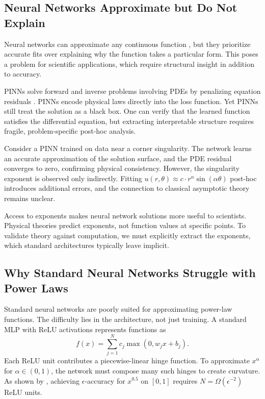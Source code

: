 \documentclass{article}
\theoremstyle{plain}
\theoremstyle{definition}
\theoremstyle{remark}
\begin{document}
\subsection{Neural Networks Approximate but Do Not Explain}

Neural networks can approximate any continuous function \cite{cybenko1989approximation}, but they prioritize accurate fits over explaining why the function takes a particular form. This poses a problem for scientific applications, which require structural insight in addition to accuracy.

PINNs solve forward and inverse problems involving PDEs by penalizing equation residuals \cite{raissi2019physics,karniadakis2021physics}. PINNs encode physical laws directly into the loss function. Yet PINNs still treat the solution as a black box. One can verify that the learned function satisfies the differential equation, but extracting interpretable structure requires fragile, problem-specific post-hoc analysis.

Consider a PINN trained on data near a corner singularity. The network learns an accurate approximation of the solution surface, and the PDE residual converges to zero, confirming physical consistency. However, the singularity exponent is observed only indirectly. Fitting $u(r,\theta) \approx c \cdot r^\alpha \sin(\alpha\theta)$ post-hoc introduces additional errors, and the connection to classical asymptotic theory remains unclear.

Access to exponents makes neural network solutions more useful to scientists. Physical theories predict exponents, not function values at specific points. To validate theory against computation, we must explicitly extract the exponents, which standard architectures typically leave implicit.

\subsection{Why Standard Neural Networks Struggle with Power Laws}

Standard neural networks are poorly suited for approximating power-law functions. The difficulty lies in the architecture, not just training. A standard MLP with ReLU activations represents functions as
\begin{equation}
	f(x) = \sum_{j=1}^{N} c_j \max(0, w_j x + b_j).
\end{equation}
Each ReLU unit contributes a piecewise-linear hinge function. To approximate $x^\alpha$ for $\alpha \in (0,1)$, the network must compose many such hinges to create curvature. As shown by \citet{nguessan2025msn}, achieving $\epsilon$-accuracy for $x^{0.5}$ on $[0,1]$ requires $N = \Omega(\epsilon^{-2})$ ReLU units.
\end{document}
